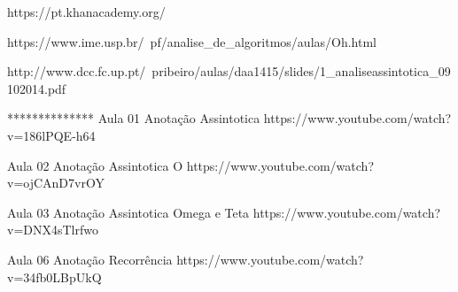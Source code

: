 https://pt.khanacademy.org/

https://www.ime.usp.br/~pf/analise_de_algoritmos/aulas/Oh.html

http://www.dcc.fc.up.pt/~pribeiro/aulas/daa1415/slides/1_analiseassintotica_09102014.pdf

**************
Aula 01 Anotação Assintotica 
https://www.youtube.com/watch?v=186lPQE-h64

Aula 02 Anotação Assintotica O
https://www.youtube.com/watch?v=ojCAnD7vrOY

Aula 03 Anotação Assintotica Omega e Teta
https://www.youtube.com/watch?v=DNX4sTlrfwo

Aula 06 Anotação Recorrência
https://www.youtube.com/watch?v=34fb0LBpUkQ


